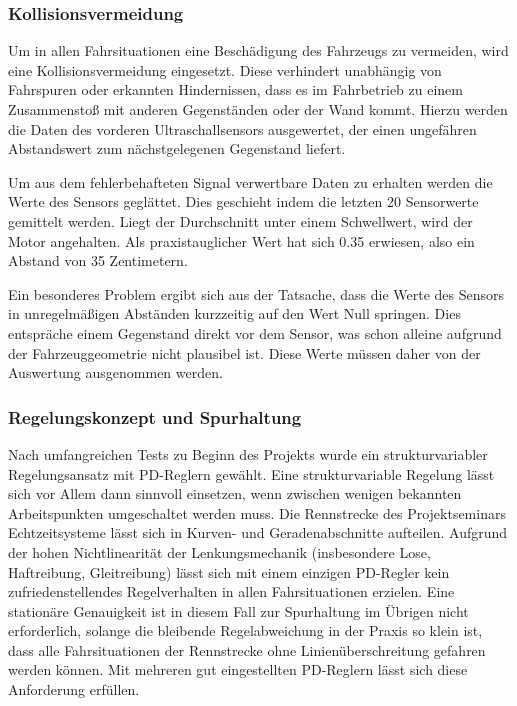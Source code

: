 \subsubsection{Kollisionsvermeidung}
\label{sec:kollision}
Um in allen Fahrsituationen eine Beschädigung des Fahrzeugs zu vermeiden, wird eine Kollisionsvermeidung eingesetzt. Diese verhindert unabhängig von Fahrspuren oder erkannten Hindernissen, dass es im Fahrbetrieb zu einem Zusammenstoß mit anderen Gegenständen oder der Wand kommt. Hierzu werden die Daten des vorderen Ultraschallsensors ausgewertet, der einen ungefähren Abstandswert zum nächstgelegenen Gegenstand liefert.

Um aus dem fehlerbehafteten Signal verwertbare Daten zu erhalten werden die Werte des Sensors geglättet. Dies geschieht indem die letzten 20 Sensorwerte gemittelt werden. Liegt der Durchschnitt unter einem Schwellwert, wird der Motor angehalten. Als praxistauglicher Wert hat sich 0.35 erwiesen, also ein Abstand von 35 Zentimetern.

Ein besonderes Problem ergibt sich aus der Tatsache, dass die Werte des Sensors in unregelmäßigen Abständen kurzzeitig auf den Wert Null springen. Dies entspräche einem Gegenstand direkt vor dem Sensor, was schon alleine aufgrund der Fahrzeuggeometrie nicht plausibel ist. Diese Werte müssen daher von der Auswertung ausgenommen werden.



\subsubsection{Regelungskonzept und Spurhaltung}
\label{sec:wallfollower}
Nach umfangreichen Tests zu Beginn des Projekts wurde ein strukturvariabler Regelungsansatz mit PD-Reglern gewählt. Eine strukturvariable Regelung lässt sich vor Allem dann sinnvoll einsetzen, wenn zwischen wenigen bekannten Arbeitspunkten umgeschaltet werden muss. Die Rennstrecke des Projektseminars Echtzeitsysteme lässt sich in Kurven- und Geradenabschnitte aufteilen. Aufgrund der hohen Nichtlinearität der Lenkungsmechanik (insbesondere Lose, Haftreibung, Gleitreibung) lässt sich mit einem einzigen PD-Regler kein zufriedenstellendes Regelverhalten in allen Fahrsituationen erzielen. Eine stationäre Genauigkeit ist in diesem Fall zur Spurhaltung im Übrigen nicht erforderlich, solange die bleibende Regelabweichung in der Praxis so klein ist, dass alle Fahrsituationen der Rennstrecke ohne Linienüberschreitung gefahren werden können. Mit mehreren gut eingestellten PD-Reglern lässt sich diese Anforderung erfüllen.

